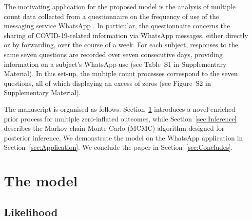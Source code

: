 \documentclass[11pt]{article}
\begin{document}
The motivating application for the proposed model is the analysis of multiple count data collected from a questionnaire on the frequency of use of the messaging service WhatsApp \citep{clinicaltrials2021}. In particular, the questionnaire concerns the sharing of COVID-19-related information via WhatsApp messages, either directly or by forwarding, over the course of a week. For each subject, responses to the same seven questions are recorded over seven consecutive days, providing information on a  subject's WhatsApp use (see 
Table~S1 in Supplementary Material). In this set-up, the multiple count processes correspond to the seven questions, all of which displaying an excess of zeros (see Figure~S2 in Supplementary Material).

The manuscript is organised as follows. Section~\ref{sec:Model} introduces a novel enriched prior process for multiple zero-inflated outcomes, while Section~\ref{sec:Inference} describes the Markov chain Monte Carlo (MCMC) algorithm designed for posterior inference. We demonstrate the model on  the WhatsApp application in Section~\ref{sec:Application}. We conclude the paper in  Section~\ref{sec:Concludes}.


\section{The model}\label{sec:Model}

\subsection{Likelihood}
\end{document}
